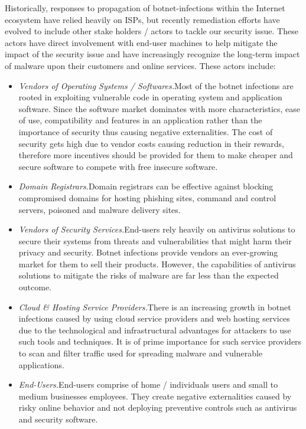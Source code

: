 Historically, responses to propagation of botnet-infections within the Internet ecosystem have relied heavily on ISPs, but recently remediation efforts have evolved to include other stake holders / actors to tackle our security issue. These actors have direct involvement with end-user machines to help mitigate the impact of the security issue and have increasingly recognize the long-term impact of malware upon their customers and online services. These actors include: 

\begin{itemize}
\item \textit{Vendors of Operating Systems / Softwares.}Most of the botnet infections are rooted in exploiting vulnerable code in operating system and application software. Since the software market dominates with more characteristics, ease of use, compatibility and features in an application rather than the importance of security thus causing negative externalities. The cost of security gets high due to vendor costs causing reduction in their rewards, therefore more incentives should be provided for them to make cheaper and secure software to compete with free insecure software.
\item \textit{Domain Registrars.}Domain registrars can be effective against blocking compromised domains for hosting phishing sites, command and control servers, poisoned and malware delivery sites.
\item \textit{Vendors of Security Services.}End-users rely heavily on antivirus solutions to secure their systems from threats and vulnerabilities that might harm their privacy and security. Botnet infections provide vendors an ever-growing market for them to sell their products. However, the capabilities of antivirus solutions to mitigate the risks of malware are far less than the expected outcome.
\item \textit{Cloud & Hosting Service Providers.}There is an increasing growth in botnet infections caused by using cloud service providers and web hosting services due to the technological and infrastructural advantages for attackers to use such tools and techniques. It is of prime importance for such service providers to scan and filter traffic used for spreading malware and vulnerable applications.
\item \textit{End-Users.}End-users comprise of home / individuals users and small to medium businesses employees. They create negative externalities caused by risky online behavior and not deploying preventive controls such as antivirus and security software.
\end{itemize}
